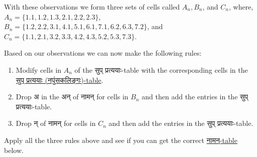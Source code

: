 \documentclass[leqno,fleqn,12pt]{article}%
\newenvironment{ewosp}{\begin{enumerate} \setlength{\itemsep}{0mm}
    \setlength{\parskip}{0mm}}{\end{enumerate}}
\begin{document}
With these observations we form three sets of cells called $A_{n}, B_{n}$, and $C_{n}$, where, \\
$A_{n} = \{1.1, 1.2, 1.3, 2.1, 2.2, 2.3\}$, \\%
$B_{n} = \{1.2, 2.2, 3.1, 4.1, 5.1, 6.1, 7.1, 6.2, 6.3, 7.2\}$,  and \\ 
$C_{n} = \{1.1, 2.1, 3.2, 3.3, 4.2, 4.3, 5.2, 5.3, 7.3\}$. 

Based on our observations we can now make the following rules:
\begin{ewosp}
\item Modify cells in $A_{n}$ of the सुप् प्रत्ययाः-table with the corresponding cells in the \hyperlink{सुप् प्रत्ययाः (नपु॰)}{सुप् प्रत्ययाः (नपुंसकलिङ्गः)-table}.
\item Drop अ in the अन्  of नामन् for cells in $B_{n}$ and then add the entries in the सुप् प्रत्ययाः-table.
\item Drop न् of नामन् for cells in $C_{n}$ and then add the entries in the सुप् प्रत्ययाः-table.
\end{ewosp}

Apply all the three rules above and see if you can get the correct \hyperlink{नामन् (नपु॰) Name}{नामन्-table} below.
\end{document}
